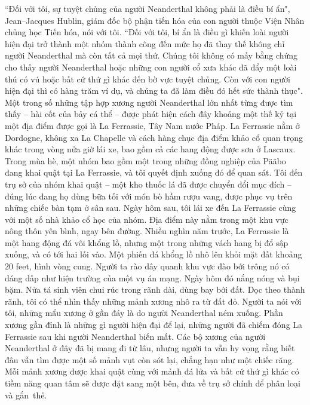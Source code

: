 \begin{multicols}{2}
\begin{figure}[H]
		\vspace*{-10pt}
	\end{figure}
	``Đối với tôi, sự tuyệt chủng của người Neanderthal không phải là điều bí ẩn", Jean--Jacques Hublin, giám đốc bộ phận tiến hóa của con người thuộc Viện Nhân chủng học Tiến hóa, nói với tôi. ``Đối với tôi, bí ẩn là điều gì khiến loài người hiện đại trở thành một nhóm thành công đến mức họ đã thay thế không chỉ người Neanderthal mà còn tất cả mọi thứ. Chúng tôi không có mấy bằng chứng cho thấy người Neanderthal hoặc những con người cổ xưa khác đã đẩy một loài thú có vú hoặc bất cứ thứ gì khác đến bờ vực tuyệt chủng. Còn với con người hiện đại thì có hàng trăm ví dụ, và chúng ta đã làm điều đó hết sức thành thục".
	\vskip 0.1cm
	Một trong số những tập hợp xương người Neanderthal lớn nhất từng được tìm thấy -- hài cốt của bảy cá thể -- được phát hiện cách đây khoảng một thế kỷ tại một địa điểm được gọi là La Ferrassie, Tây Nam nước Pháp. La Ferrassie nằm ở Dordogne, không xa La Chapelle và cách hàng chục địa điểm khảo cổ quan trọng khác trong vòng nửa giờ lái xe, bao gồm cả các hang động được sơn ở Lascaux. Trong mùa hè, một nhóm bao gồm một trong những đồng nghiệp của Pääbo đang khai quật tại La Ferrassie, và tôi quyết định xuống đó để quan sát. Tôi đến trụ sở của nhóm khai quật -- một kho thuốc lá đã được chuyển đổi mục đích -- đúng lúc đang họ dùng bữa tối với món bò hầm rượu vang, được phục vụ trên những chiếc bàn tạm ở sân sau.
	\vskip 0.1cm
	Ngày hôm sau, tôi lái xe đến La Ferrassie cùng với một số nhà khảo cổ học của nhóm. Địa điểm này nằm trong một khu vực nông thôn yên bình, ngay bên đường. Nhiều nghìn năm trước, La Ferrassie là một hang động đá vôi khổng lồ, nhưng một trong những vách hang bị đổ sập xuống, và có tới hai lối vào. Một phiến đá khổng lồ nhô lên khỏi mặt đất khoảng $20$ feet, hình vòng cung. Người ta rào dây quanh khu vực đào bới trông nó có dáng dấp như hiện trường của một vụ án mạng.
	\vskip 0.1cm
	Ngày hôm đó nắng nóng và bụi bặm. Nửa tá sinh viên chui rúc trong rãnh dài, dùng bay bới đất. Dọc theo thành rãnh, tôi có thể nhìn thấy những mảnh xương nhô ra từ đất đỏ. Người ta nói với tôi, những mẩu xương ở gần đáy là do người Neanderthal ném xuống. Phần xương gần đỉnh là những gì người hiện đại để lại, những người đã chiếm đóng La Ferrassie sau khi người Neanderthal biến mất. Các bộ xương của người Neanderthal ở đây đã bị mang đi từ lâu, nhưng người ta vẫn hy vọng rằng biết đâu vẫn tìm được một số mảnh vụt còn sót lại, chẳng hạn như một chiếc răng. Mỗi mảnh xương được khai quật cùng với mảnh đá lửa và bất cứ thứ gì khác có tiềm năng quan tâm sẽ được đặt sang một bên, đưa về trụ sở chính để phân loại và gắn~thẻ.

\end{multicols}
